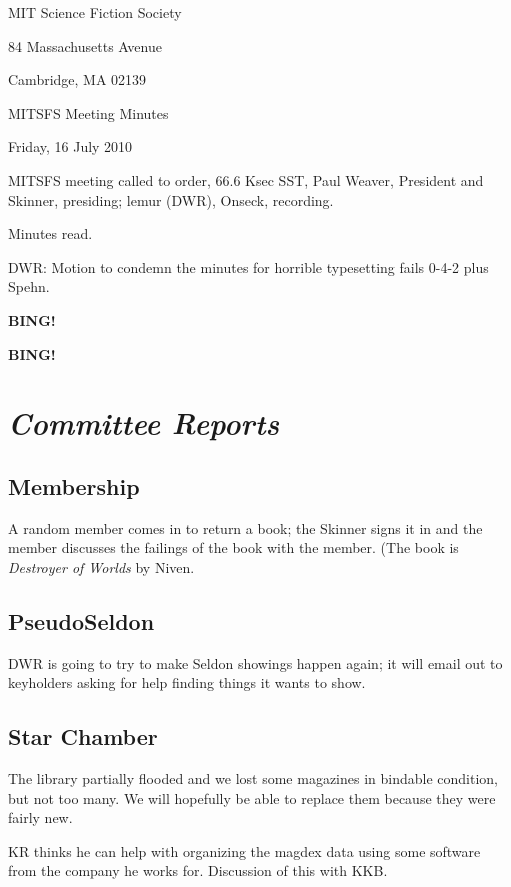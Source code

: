 \documentclass[10pt]{article}
\newcommand{\bing}{{\bf BING!} }
\newcommand{\goto}[1]{\bing \vskip 12pt \section*{{\em{#1}}}}
\newcommand{\ps}{ plus Spehn\xspace}
\newcommand{\skinner}{Paul Weaver, President and Skinner}
\newcommand{\onseck}{lemur (DWR), Onseck}
\newcommand{\meetingdate}{Friday, 16 July 2010}
\begin{document}
\begin{center}

MIT Science Fiction Society

84 Massachusetts Avenue

Cambridge, MA 02139

\vspace{12pt}

MITSFS Meeting Minutes

\meetingdate

\end{center}

\vspace{18pt}

\setlength{\parskip}{6pt}

\noindent
MITSFS meeting called to order, 66.6 Ksec SST,
\skinner, presiding; \onseck, recording.

Minutes read.

DWR: Motion to condemn the minutes for horrible typesetting fails 0-4-2\ps.

\bing

\goto{Committee Reports}

\subsection*{Membership}

A random member comes in to return a book; the Skinner signs it in and the
member discusses the failings of the book with the member.  (The book is 
\emph{Destroyer of Worlds} by Niven.

\subsection*{PseudoSeldon}

DWR is going to try to make Seldon showings happen again; it will email
out to keyholders asking for help finding things it wants to show.

\subsection*{Star Chamber}

The library partially flooded and we lost some magazines in bindable condition,
but not too many.  We will hopefully be able to replace them because they
were fairly new.

KR thinks he can help with organizing the magdex data using some software
from the company he works for.  Discussion of this with KKB.
\end{document}
